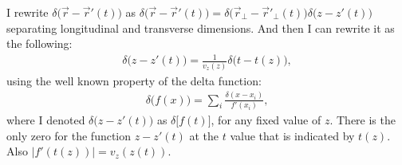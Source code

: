     I rewrite $\delta\big(\vec{r} - \vec{r}'(t)\big)$ as $\delta\big(\vec{r} - \vec{r}'(t)\big) = \delta \big(\vec{r}_{\perp} - \vec{r}'_{\perp}(t)\big)\delta\big(z - z'(t)\big)$ separating longitudinal and transverse dimensions. And then I can rewrite it as the following:
    \begin{align}
        \delta\big(z - z'(t)\big) = \frac{1}{v_z(z)}\delta\big(t - t(z) \big),
    \end{align}
    using the well known property of the delta function:
    \begin{align}
        \delta\big(f(x)\big) = \sum_i \frac{\delta(x - x_i)}{f'(x_i)}, 
    \end{align}
    where I denoted $\delta\big(z - z'(t)\big)$ as $\delta \big[f(t)\big]$, for any fixed value of $z$. There is the only zero for the function $z - z'(t)$ at the $t$ value that is indicated by $t(z)$. Also $|f'(t(z))| = v_z(z(t))$.
    
